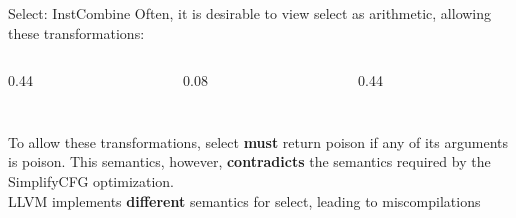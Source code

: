 \begin{frame}[fragile]{Select: InstCombine}
Often, it is desirable to view select as arithmetic, allowing these transformations:
   \begin{columns}[c]
       \begin{column}{0.44\textwidth}
           \begin{lstlisting}[style=llvmmono]
%x = select i1 %c, true, %b
           \end{lstlisting}
       \end{column}
       \begin{column}{0.08\textwidth}
           \transform
       \end{column}
       \begin{column}{0.44\textwidth}
           \begin{lstlisting}[style=llvmmono]
%x = or i1 %c, %b
           \end{lstlisting}
       \end{column}
   \end{columns}
   To allow these transformations, select \textbf{must} return poison if any of its arguments is poison. This semantics, however, \textbf{contradicts} the semantics required by the SimplifyCFG optimization.\\
   \vspace{0.5em}
   LLVM implements \textbf{different} semantics for select, leading to miscompilations
\end{frame}
